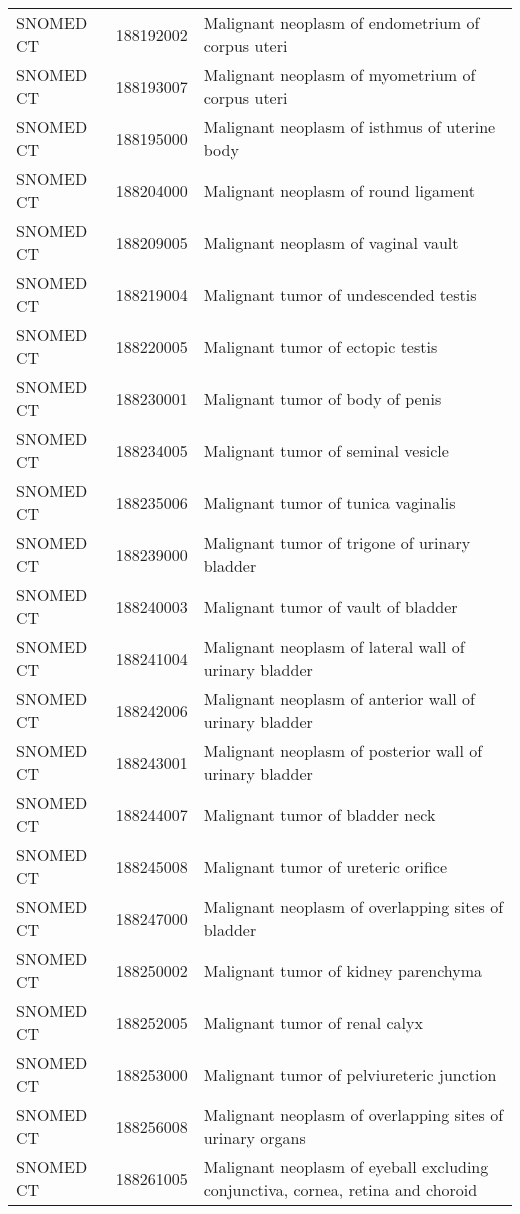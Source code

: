 \begin{longtable}{p{}p{}p{}}
  SNOMED CT & 188192002 & Malignant neoplasm of endometrium of corpus uteri \\ 
  SNOMED CT & 188193007 & Malignant neoplasm of myometrium of corpus uteri \\ 
  SNOMED CT & 188195000 & Malignant neoplasm of isthmus of uterine body \\ 
  SNOMED CT & 188204000 & Malignant neoplasm of round ligament \\ 
  SNOMED CT & 188209005 & Malignant neoplasm of vaginal vault \\ 
  SNOMED CT & 188219004 & Malignant tumor of undescended testis \\ 
  SNOMED CT & 188220005 & Malignant tumor of ectopic testis \\ 
  SNOMED CT & 188230001 & Malignant tumor of body of penis \\ 
  SNOMED CT & 188234005 & Malignant tumor of seminal vesicle \\ 
  SNOMED CT & 188235006 & Malignant tumor of tunica vaginalis \\ 
  SNOMED CT & 188239000 & Malignant tumor of trigone of urinary bladder \\ 
  SNOMED CT & 188240003 & Malignant tumor of vault of bladder \\ 
  SNOMED CT & 188241004 & Malignant neoplasm of lateral wall of urinary bladder \\ 
  SNOMED CT & 188242006 & Malignant neoplasm of anterior wall of urinary bladder \\ 
  SNOMED CT & 188243001 & Malignant neoplasm of posterior wall of urinary bladder \\ 
  SNOMED CT & 188244007 & Malignant tumor of bladder neck \\ 
  SNOMED CT & 188245008 & Malignant tumor of ureteric orifice \\ 
  SNOMED CT & 188247000 & Malignant neoplasm of overlapping sites of bladder \\ 
  SNOMED CT & 188250002 & Malignant tumor of kidney parenchyma \\ 
  SNOMED CT & 188252005 & Malignant tumor of renal calyx \\ 
  SNOMED CT & 188253000 & Malignant tumor of pelviureteric junction \\ 
  SNOMED CT & 188256008 & Malignant neoplasm of overlapping sites of urinary organs \\ 
  SNOMED CT & 188261005 & Malignant neoplasm of eyeball excluding conjunctiva, cornea, retina and choroid \\ 

\end{longtable}

